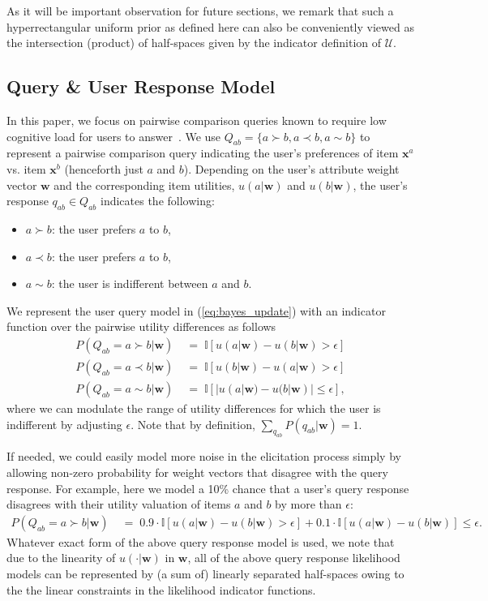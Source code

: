\documentclass{article} %
\newcommand{\I}{\mathbb{I}}
\newcommand{\U}{\mathcal{U}}
\renewcommand{\vec}[1]{\mathbf{#1}}
\begin{document}
As it will be important observation for future sections, we remark
that such a hyperrectangular uniform prior as defined here can also be
conveniently viewed as the intersection (product) of half-spaces given
by the indicator definition of $\U$.

\subsection{Query \& User Response Model}

\label{sec:query_and_user_model}

In this paper, we focus on pairwise comparison queries known to
require low cognitive load for users to answer~\cite{conitzer09161}.
We use $Q_{ab} = \{ a \succ b, a \prec b, a \sim b \}$ to represent a
pairwise comparison query indicating the user's preferences of item
$\vec{x}^a$ vs. item $\vec{x}^b$ (henceforth just $a$ and $b$).
Depending on the user's attribute weight vector $\vec{w}$ and the
corresponding item utilities, $u(a|\vec{w})$ and $u(b|\vec{w})$, the
user's response $q_{ab} \in Q_{ab}$ indicates the following:
\begin{itemize}
\item $a \succ b$: the user prefers $a$ to $b$,
\item $a \prec b$: the user prefers $a$ to $b$,
\item $a \sim b$:  the user is indifferent between $a$ and $b$.
\end{itemize}

We represent the user query model in
(\ref{eq:bayes_update}) with an indicator function over the pairwise utility
differences as follows 
\begin{align}
P(Q_{ab}=a \succ b|\vec{w}) & \; = \; \I[u(a|\vec{w}) - u(b|\vec{w}) > \epsilon] \nonumber \\
P(Q_{ab}=a \prec b|\vec{w}) & \; = \; \I[u(b|\vec{w}) - u(a|\vec{w}) > \epsilon] \nonumber \\
P(Q_{ab}=a \sim  b|\vec{w}) & \; = \; \I[|u(a|\vec{w}) - u(b|\vec{w})| \leq \epsilon], 
\label{eq:p_qij_hat}
\end{align}
where we can modulate the range of utility differences for which the
user is indifferent by adjusting $\epsilon$.  Note that by definition,
$\sum_{q_{ab}} P(q_{ab}|\vec{w}) = 1$.

If needed, we could easily model more noise in the elicitation process
simply by allowing non-zero probability for weight vectors that
disagree with the query response.  For example, here we model a 10\%
chance that a user's query response disagrees with their utility valuation
of items $a$ and $b$ by more than $\epsilon$:
\begin{align}
P(Q_{ab}=a \succ b|\vec{w}) & \; = \; 0.9 \cdot \I[u(a|\vec{w}) - u(b|\vec{w}) > \epsilon]  + 0.1 \cdot \I[u(a|\vec{w}) - u(b|\vec{w})] \leq \epsilon \label{eq:p_qij_mod} .
\end{align} 
Whatever exact form of the above query response model is used, we note
that due to the linearity of $u(\cdot|\vec{w})$ in $\vec{w}$, all of
the above query response likelihood models can be represented by (a
sum of) linearly separated half-spaces owing to the the linear
constraints in the likelihood indicator functions.
\end{document}

